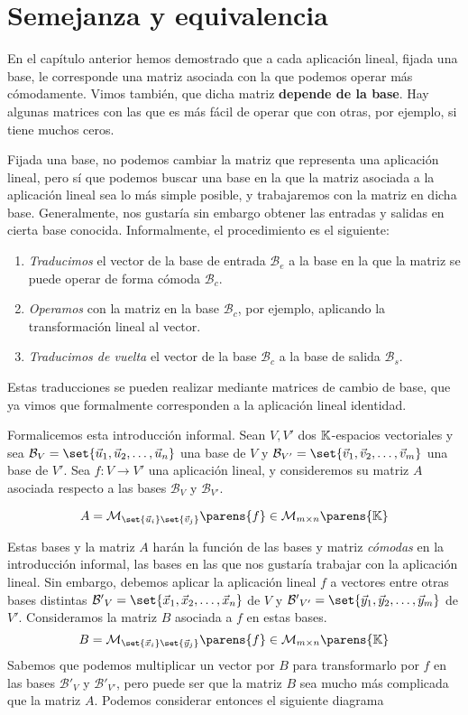 \documentclass[../algebra_lineal.tex]{subfiles}
\begin{document}
\section{Semejanza y equivalencia}

En el capítulo anterior hemos demostrado que a cada aplicación lineal, fijada una base, le corresponde una matriz asociada con la que podemos operar más cómodamente. Vimos también, que dicha matriz \textbf{depende de la base}. Hay algunas matrices con las que es más fácil de operar que con otras, por ejemplo, si tiene muchos ceros. 

Fijada una base, no podemos cambiar la matriz que representa una aplicación lineal, pero sí que podemos buscar una base en la que la matriz asociada a la aplicación lineal sea lo más simple posible, y trabajaremos con la matriz en dicha base. Generalmente, nos gustaría sin embargo obtener las entradas y salidas en cierta base conocida. Informalmente, el procedimiento es el siguiente: 

\begin{enumerate}
    \item \textit{Traducimos} el vector de la base de entrada $\mathcal{B}_e$ a la base en la que la matriz se puede operar de forma cómoda $\mathcal{B}_c$.
    \item \textit{Operamos} con la matriz en la base $\mathcal{B}_c$, por ejemplo, aplicando la transformación lineal al vector.
    \item \textit{Traducimos de vuelta} el vector de la base $\mathcal{B}_c$ a la base de salida $\mathcal{B}_s$.
\end{enumerate}

Estas traducciones se pueden realizar mediante matrices de cambio de base, que ya vimos que formalmente corresponden a la aplicación lineal identidad. 

Formalicemos esta introducción informal. Sean $V, V'$ dos $\mathbb{K}$-espacios vectoriales y sea $\mathcal{B}_V=\set{\vlst{u}{n}}$ una base de $V$ y $\mathcal{B}_{V'}=\set{\vlst{v}{m}}$ una base de $V'$. Sea $f : V \to V'$ una aplicación lineal, y consideremos su matriz $A$ asociada respecto a las bases $\mathcal{B}_V$ y $\mathcal{B}_{V'}$.

\[
    A = \mathcal{M}_{\set{\vu_i} \set{\vv_{j}}}\parens{f} \in \mathcal{M}_{m\times n}\parens{\K}  
\]

Estas bases y la matriz $A$ harán la función de las bases y matriz \textit{cómodas} en la introducción informal, las bases en las que nos gustaría trabajar con la aplicación lineal. Sin embargo, debemos aplicar la aplicación lineal $f$ a vectores entre otras bases distintas $\mathcal{B'}_{V} = \set{\vlst{x}{n}}$ de $V$ y $\mathcal{B'}_{V'} = \set{\vlst{y}{m}}$ de $V'$. Consideramos la matriz $B$ asociada a $f$ en estas bases.
\[
    B = \mathcal{M}_{\set{\vx_i} \set{\vy_{j}}}\parens{f} \in \mathcal{M}_{m\times n}\parens{\K}  
\]
Sabemos que podemos multiplicar un vector por $B$ para transformarlo por $f$ en las bases $\mathcal{B'}_{V}$ y $\mathcal{B'}_{V'}$, pero puede ser que la matriz $B$ sea mucho más complicada que la matriz $A$. Podemos considerar entonces el siguiente diagrama
\end{document}
